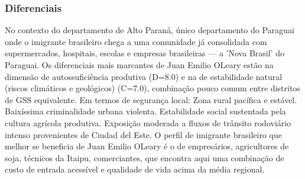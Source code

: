 \subsubsection*{Diferenciais}\label{dif-juan-emilio-oleary-1010}
No contexto do departamento de Alto Paraná, único departamento do Paraguai onde o imigrante brasileiro chega a uma comunidade já consolidada com supermercados, hospitais, escolas e empresas brasileiras — a 'Nova Brasil' do Paraguai. Os diferenciais mais marcantes de Juan Emilio OLeary estão na dimensão de autossuficiência produtiva (D=8.0) e na de estabilidade natural (riscos climáticos e geológicos) (C=7.0), combinação pouco comum entre distritos de GSS equivalente. Em termos de segurança local: Zona rural pacífica e estável. Baixíssima criminalidade urbana violenta. Estabilidade social sustentada pela cultura agrícola produtiva. Exposição moderada a fluxos de trânsito rodoviário intenso provenientes de Ciudad del Este. O perfil de imigrante brasileiro que melhor se beneficia de Juan Emilio OLeary é o de empresários, agricultores de soja, técnicos da Itaipu, comerciantes, que encontra aqui uma combinação de custo de entrada acessível e qualidade de vida acima da média regional.

